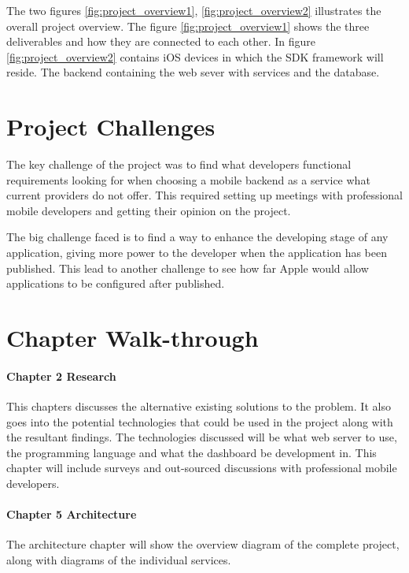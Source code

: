 The two figures \ref{fig:project_overview1}, \ref{fig:project_overview2} illustrates the overall project overview. The figure \ref{fig:project_overview1} shows the three deliverables and how they are connected to each other. In figure \ref{fig:project_overview2} contains iOS devices in which the SDK framework will reside. The backend containing the web sever with services and the database. 

\section{Project Challenges}

The key challenge of the project was to find what developers functional requirements looking for when choosing a mobile backend as a service what current providers do not offer. This required setting up meetings with professional mobile developers and getting their opinion on the project.

The big challenge faced is to find a way to enhance the developing stage of any application, giving more power to the developer when the application has been published. This lead to another challenge to see how far Apple would allow applications to be configured after published.

\section{Chapter Walk-through}

\paragraph{Chapter 2 Research}

This chapters discusses the alternative existing solutions to the problem. It also goes into the potential technologies that could be used in the project along with the resultant findings. The technologies discussed will be what web server to use, the programming language and what the dashboard be development in. This chapter will include surveys and out-sourced discussions with professional mobile developers.

\paragraph{Chapter 5 Architecture}

The architecture chapter will show the overview diagram of the complete project, along with diagrams of the individual services.

